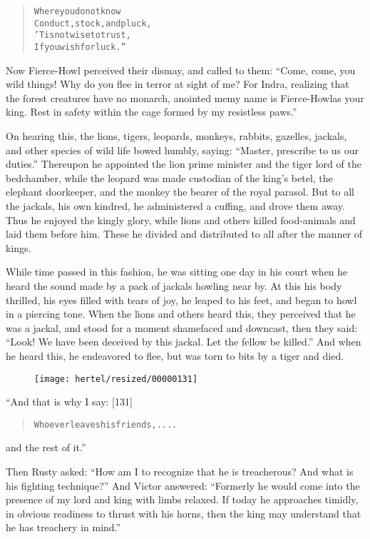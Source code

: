\documentclass[article, twoside, 10pt]{memoir}
\renewenvironment{verbatim}{%
\begin{quote}%
\vskip -10pt%
\begin{alltt}\normalfont\small}{\end{alltt}%
\end{quote}%
\vskip -10pt
} %
\begin{document}
\begin{verbatim}
Where you do not know
    Conduct, stock, and pluck,
'Tis not wise to trust,
    If you wish for luck.”
\end{verbatim}
Now Fierce-Howl perceived their dismay, and called to them:
``Come, come, you wild things! Why do you flee in terror at sight of me? For Indra, realizing that the forest creatures have no monarch, anointed me{\textemdash}my name is Fierce-Howl{\textemdash}as your king. Rest in safety within the cage formed by my resistless paws.''

On hearing this, the lions, tigers, leopards, monkeys, rabbits,
gazelles, jackals, and other species of wild life bowed humbly,
saying: ``Master, prescribe to us our duties.'' Thereupon he
appointed the lion prime minister and the tiger lord of the
bedchamber, while the leopard was made custodian of the king's
betel, the elephant doorkeeper, and the monkey the bearer of the
royal parasol. But to all the jackals, his own kindred, he
administered a cuffing, and drove them away. Thus he enjoyed the
kingly glory, while lions and others killed food-animals and laid
them before him. These he divided and distributed to all after the
manner of kings.

While time passed in this fashion, he was sitting one day in his
court when he heard the sound made by a pack of jackals howling
near by. At this his body thrilled, his eyes filled with tears of
joy, he leaped to his feet, and began to howl in a piercing tone.
When the lions and others heard this, they perceived that he was a
jackal, and stood for a moment shamefaced and downcast, then they
said:
``Look! We have been deceived by this jackal. Let the fellow be killed.''
And when he heard this, he endeavored to flee, but was torn to bits
by a tiger and died.

\begin{figure}[p]\texttt{[image: hertel/resized/00000131]}\end{figure}“And that is why I say: [131]

\begin{verbatim}
Whoever leaves his friends, ....
\end{verbatim}
and the rest of it.”

Then Rusty asked:
``How am I to recognize that he is treacherous? And what is his fighting technique?''
And Victor answered:
``Formerly he would come into the presence of my lord and king with limbs relaxed. If today he approaches timidly, in obvious readiness to thrust with his horns, then the king may understand that he has treachery in mind.''
\end{document}
